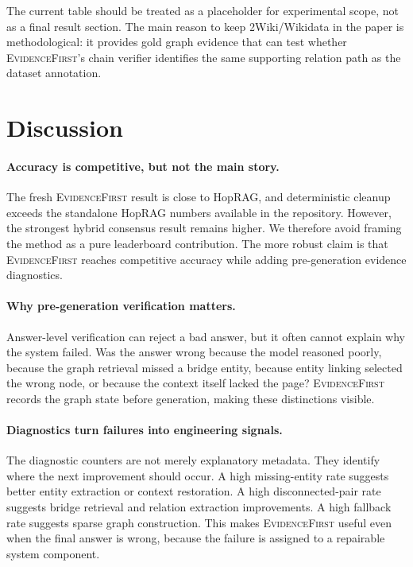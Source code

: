 \documentclass[runningheads]{llncs}
\newcommand{\sys}{\textsc{EvidenceFirst}\xspace}
\begin{document}
The current table should be treated as a placeholder for experimental scope,
not as a final result section. The main reason to keep 2Wiki/Wikidata in the
paper is methodological: it provides gold graph evidence that can test whether
\sys's chain verifier identifies the same supporting relation path as the
dataset annotation.

\section{Discussion}
\label{sec:discussion}

\paragraph{Accuracy is competitive, but not the main story.}
The fresh \sys result is close to HopRAG, and deterministic cleanup exceeds the
standalone HopRAG numbers available in the repository. However, the strongest
hybrid consensus result remains higher. We therefore avoid framing the method
as a pure leaderboard contribution. The more robust claim is that \sys reaches
competitive accuracy while adding pre-generation evidence diagnostics.

\paragraph{Why pre-generation verification matters.}
Answer-level verification can reject a bad answer, but it often cannot explain
why the system failed. Was the answer wrong because the model reasoned poorly,
because the graph retrieval missed a bridge entity, because entity linking
selected the wrong node, or because the context itself lacked the page? \sys
records the graph state before generation, making these distinctions visible.

\paragraph{Diagnostics turn failures into engineering signals.}
The diagnostic counters are not merely explanatory metadata. They identify
where the next improvement should occur. A high missing-entity rate suggests
better entity extraction or context restoration. A high disconnected-pair rate
suggests bridge retrieval and relation extraction improvements. A high fallback
rate suggests sparse graph construction. This makes \sys useful even when the
final answer is wrong, because the failure is assigned to a repairable system
component.
\end{document}
